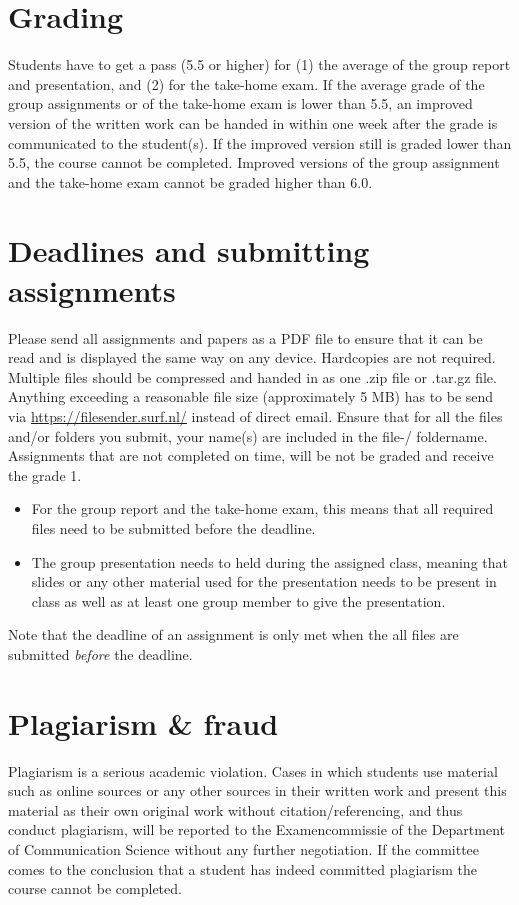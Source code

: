 \documentclass[a4paper,10pt,twocolumn]{report}
\begin{document}
	\section{Grading}
	Students have to get a pass (5.5 or higher) for (1) the average of the group report and presentation, and (2) for the take-home exam. If the average grade of the group assignments or of the take-home exam is lower than 5.5, an improved version of the written work can be handed in within one week after the grade is communicated to the student(s). If the improved version still is graded lower than 5.5, the course cannot be completed. Improved versions of the group assignment and the take-home exam cannot be graded higher than 6.0. 
	
	\section{Deadlines and submitting assignments}
	Please send all assignments and papers as a PDF file to ensure that it can be read and is displayed the same way on any device. Hardcopies are not required. Multiple files should be compressed and handed in as one .zip file or .tar.gz file. Anything exceeding a reasonable file size (approximately 5 MB) has to be send via \url{https://filesender.surf.nl/} instead of direct email. Ensure that for all the files and/or folders you submit, your name(s) are included in the file-/ foldername. \\
	
	Assignments that are not completed on time, will be not be graded and receive the grade 1. 
		\begin{itemize}
			\item For the group report and the take-home exam, this means that all required files need to be submitted before the deadline. 
			\item The group presentation needs to held during the assigned class, meaning that slides or any other material used for the presentation needs to be present in class as well as at least one group member to give the presentation. 
		\end{itemize}
	Note that the deadline of an assignment is only met when the all files are submitted \emph{before} the deadline.

	\section{Plagiarism \& fraud}
	Plagiarism is a serious academic violation. Cases in which students use material such as online sources or any other sources in their written work and present this material as their own original work without citation/referencing, and thus conduct plagiarism, will be reported to the Examencommissie of the Department of Communication Science without any further negotiation. If the committee comes to the conclusion that a student has indeed committed plagiarism the course cannot be completed. 
\end{document}
